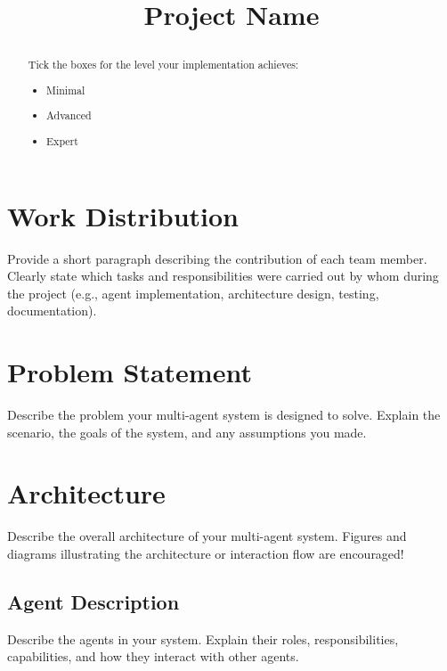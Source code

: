 \documentclass[conference]{IEEEtran}
\begin{document}
\title{Project Name

}

\author{
}

\maketitle

\begin{abstract}
Tick the boxes for the level your implementation achieves:

\begin{itemize}
    \item[$\square$] Minimal
    \item[$\boxtimes$] Advanced
    \item[$\square$] Expert
\end{itemize}

\end{abstract}

\section{Work Distribution}
Provide a short paragraph describing the contribution of each team member. 
Clearly state which tasks and responsibilities were carried out by whom during the project 
(e.g., agent implementation, architecture design, testing, documentation).

\section{Problem Statement}
Describe the problem your multi-agent system is designed to solve. 
Explain the scenario, the goals of the system, and any assumptions you made.

\section{Architecture}
Describe the overall architecture of your multi-agent system.
Figures and diagrams illustrating the architecture or interaction flow are encouraged!

\subsection{Agent Description}
Describe the agents in your system. Explain their roles, responsibilities, 
capabilities, and how they interact with other agents.
\end{document}
